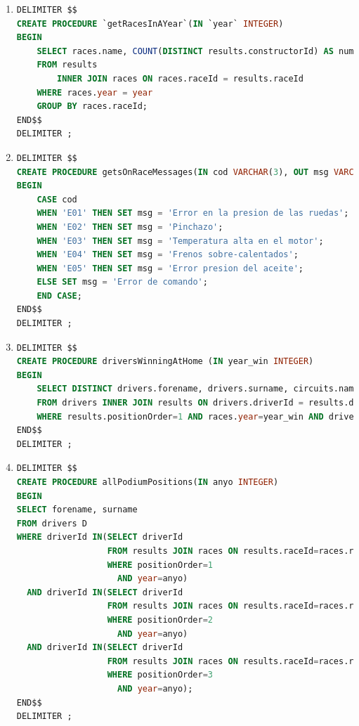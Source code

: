 \documentclass{db-practice}
\begin{document}
\begin{enumerate}

\item
\begin{lstlisting}[language=SQL]
DELIMITER $$
CREATE PROCEDURE `getRacesInAYear`(IN `year` INTEGER)
BEGIN
	SELECT races.name, COUNT(DISTINCT results.constructorId) AS numConstructors
    FROM results
    	INNER JOIN races ON races.raceId = results.raceId
    WHERE races.year = year
    GROUP BY races.raceId;
END$$
DELIMITER ;
\end{lstlisting}

\item
\begin{lstlisting}[language=SQL]
DELIMITER $$
CREATE PROCEDURE getsOnRaceMessages(IN cod VARCHAR(3), OUT msg VARCHAR(200))
BEGIN
    CASE cod
    WHEN 'E01' THEN SET msg = 'Error en la presion de las ruedas';
    WHEN 'E02' THEN SET msg = 'Pinchazo';
    WHEN 'E03' THEN SET msg = 'Temperatura alta en el motor';
    WHEN 'E04' THEN SET msg = 'Frenos sobre-calentados';
    WHEN 'E05' THEN SET msg = 'Error presion del aceite';
    ELSE SET msg = 'Error de comando';
    END CASE;
END$$
DELIMITER ;
\end{lstlisting}

\item
\begin{lstlisting}[language=SQL]
DELIMITER $$
CREATE PROCEDURE driversWinningAtHome (IN year_win INTEGER)
BEGIN
    SELECT DISTINCT drivers.forename, drivers.surname, circuits.name
    FROM drivers INNER JOIN results ON drivers.driverId = results.driverId INNER JOIN races ON results.raceId=races.raceId INNER JOIN constructors ON results.constructorId=constructors.constructorId INNER JOIN circuits ON circuits.circuitId=races.circuitId 
    WHERE results.positionOrder=1 AND races.year=year_win AND drivers.nationality=constructors.nationality;
END$$
DELIMITER ;
\end{lstlisting}

\item
\begin{lstlisting}[language=SQL]
DELIMITER $$
CREATE PROCEDURE allPodiumPositions(IN anyo INTEGER)
BEGIN
SELECT forename, surname
FROM drivers D
WHERE driverId IN(SELECT driverId
                  FROM results JOIN races ON results.raceId=races.raceId
                  WHERE positionOrder=1
                    AND year=anyo)
  AND driverId IN(SELECT driverId
                  FROM results JOIN races ON results.raceId=races.raceId
                  WHERE positionOrder=2
                    AND year=anyo)
  AND driverId IN(SELECT driverId
                  FROM results JOIN races ON results.raceId=races.raceId
                  WHERE positionOrder=3
                    AND year=anyo);
END$$ 
DELIMITER ;  
\end{lstlisting}


\end{enumerate}
\end{document}
